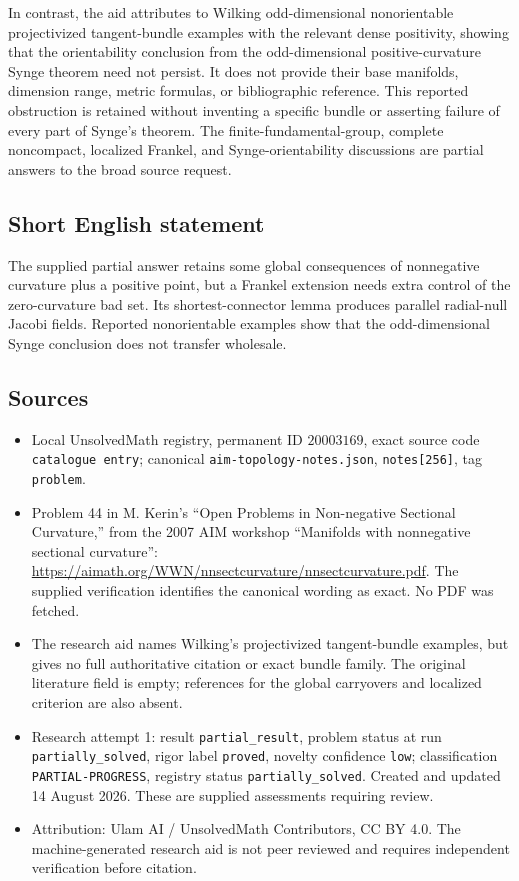 \documentclass[11pt]{article}
\begin{document}
In contrast, the aid attributes to Wilking odd-dimensional nonorientable projectivized tangent-bundle examples with the relevant dense positivity, showing that the orientability conclusion from the odd-dimensional positive-curvature Synge theorem need not persist. It does not provide their base manifolds, dimension range, metric formulas, or bibliographic reference. This reported obstruction is retained without inventing a specific bundle or asserting failure of every part of Synge's theorem. The finite-fundamental-group, complete noncompact, localized Frankel, and Synge-orientability discussions are partial answers to the broad source request.
\subsection{Short English statement}
The supplied partial answer retains some global consequences of nonnegative curvature plus a positive point, but a Frankel extension needs extra control of the zero-curvature bad set. Its shortest-connector lemma produces parallel radial-null Jacobi fields. Reported nonorientable examples show that the odd-dimensional Synge conclusion does not transfer wholesale.
\subsection{Sources}
\begin{itemize}
\item Local UnsolvedMath registry, permanent ID \(20003169\), exact source code \texttt{catalogue entry}; canonical \texttt{aim-topology-notes.json}, \texttt{notes[256]}, tag \texttt{problem}.
\item Problem 44 in M. Kerin's ``Open Problems in Non-negative Sectional Curvature,'' from the 2007 AIM workshop ``Manifolds with nonnegative sectional curvature'': \url{https://aimath.org/WWN/nnsectcurvature/nnsectcurvature.pdf}. The supplied verification identifies the canonical wording as exact. No PDF was fetched.
\item The research aid names Wilking's projectivized tangent-bundle examples, but gives no full authoritative citation or exact bundle family. The original literature field is empty; references for the global carryovers and localized criterion are also absent.
\item Research attempt 1: result \texttt{partial\_result}, problem status at run \texttt{partially\_solved}, rigor label \texttt{proved}, novelty confidence \texttt{low}; classification \texttt{PARTIAL-PROGRESS}, registry status \texttt{partially\_solved}. Created and updated 14 August 2026. These are supplied assessments requiring review.
\item Attribution: Ulam AI / UnsolvedMath Contributors, CC BY 4.0. The machine-generated research aid is not peer reviewed and requires independent verification before citation.
\end{itemize}
\end{document}
